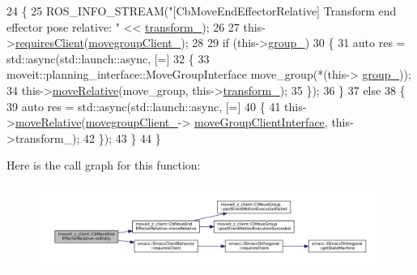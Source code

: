 \begin{DoxyCode}
24 \{
25     ROS\_INFO\_STREAM(\textcolor{stringliteral}{"[CbMoveEndEffectorRelative] Transform end effector pose relative: "} << 
      \hyperlink{classmoveit__z__client_1_1CbMoveEndEffectorRelative_a0686340d0328df4d0ecb962b61026f43}{transform\_});
26 
27     this->\hyperlink{classsmacc_1_1SmaccClientBehavior_a917f001e763a1059af337bf4e164f542}{requiresClient}(\hyperlink{classmoveit__z__client_1_1CbMoveEndEffectorRelative_a5f009b3baaaa47ad3be09d43bab33c07}{movegroupClient\_});
28 
29     \textcolor{keywordflow}{if} (this->\hyperlink{classmoveit__z__client_1_1CbMoveEndEffectorRelative_a143fdce14603f8c78aae258b605ff607}{group\_})
30     \{
31         \textcolor{keyword}{auto} res = std::async(std::launch::async, [=] 
32         \{
33                 moveit::planning\_interface::MoveGroupInterface move\_group(*(this->
      \hyperlink{classmoveit__z__client_1_1CbMoveEndEffectorRelative_a143fdce14603f8c78aae258b605ff607}{group\_}));
34                 this->\hyperlink{classmoveit__z__client_1_1CbMoveEndEffectorRelative_ae80ce575678a1f602d2fc1f68df1813f}{moveRelative}(move\_group, this->\hyperlink{classmoveit__z__client_1_1CbMoveEndEffectorRelative_a0686340d0328df4d0ecb962b61026f43}{transform\_});
35         \});
36     \}
37     \textcolor{keywordflow}{else}
38     \{
39         \textcolor{keyword}{auto} res = std::async(std::launch::async, [=] 
40         \{
41             this->\hyperlink{classmoveit__z__client_1_1CbMoveEndEffectorRelative_ae80ce575678a1f602d2fc1f68df1813f}{moveRelative}(\hyperlink{classmoveit__z__client_1_1CbMoveEndEffectorRelative_a5f009b3baaaa47ad3be09d43bab33c07}{movegroupClient\_}->
      \hyperlink{classmoveit__z__client_1_1ClMoveGroup_af86e046b837be0ef4afa9893d8808f20}{moveGroupClientInterface}, this->transform\_);
42         \});
43     \}
44 \}
\end{DoxyCode}
Here is the call graph for this function\+:
\nopagebreak
\begin{figure}[H]
\begin{center}
\leavevmode
\includegraphics[width=350pt]{classmoveit__z__client_1_1CbMoveEndEffectorRelative_ae425a51d23933a13a87df9cd26f0fc99_cgraph}
\end{center}
\end{figure}
\mbox{\label{classmoveit__z__client_1_1CbMoveEndEffectorRelative_af23c69f0919a2f62fbddf0e1dbdb83e1}} 
